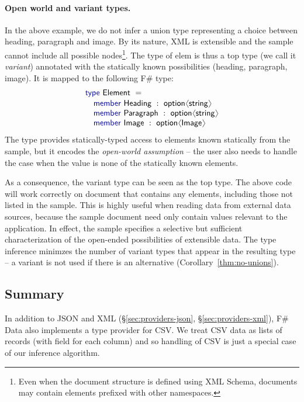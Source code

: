 \documentclass[10pt,preprint,blind,clearpagebib]{sigplanconf}
\newcommand{\langl}{\begin{picture}(4.5,7)
\put(1.1,2.5){\rotatebox{60}{\line(1,0){5.5}}}
\put(1.1,2.5){\rotatebox{300}{\line(1,0){5.5}}}
\end{picture}}
\newcommand{\rangl}{\begin{picture}(4.5,7)
\put(.9,2.5){\rotatebox{120}{\line(1,0){5.5}}}
\put(.9,2.5){\rotatebox{240}{\line(1,0){5.5}}}
\end{picture}}
\newcommand{\kvd}[1]{\textnormal{\textcolor{kvdclr}{\sffamily #1}}}
\newcommand{\ident}[1]{\textnormal{\sffamily #1}}
\begin{document}
\paragraph{Open world and variant types.}
In the above example, we do not infer a union type representing a choice between 
heading, paragraph and image. By its nature, XML is extensible and the sample cannot include all 
possible nodes\footnote{Even when the document structure is defined using XML Schema, documents may 
contain elements prefixed with other namespaces.}. The type of \ident{elem} is thus a top type (we 
call it \emph{variant}) annotated with the statically known possibilities (heading, paragraph, image). 
It is mapped to the following F\# type:
%
\begin{equation*}
\begin{array}{l}
 \kvd{type}~\ident{Element}~=  \\[0.1em]
 \quad \kvd{member}~\ident{Heading}~:~\ident{option}\langl \ident{string} \rangl\\
 \quad \kvd{member}~\ident{Paragraph}~:~\ident{option}\langl \ident{string} \rangl\\
 \quad \kvd{member}~\ident{Image}~:~\ident{option}\langl \ident{Image} \rangl\\
\end{array}
\end{equation*}
%
The type provides statically-typed access to elements known statically from the sample, but it encodes
the \emph{open-world assumption} -- the user also needs to handle the case when the value is none 
of the statically known elements. 

As a consequence, the variant type can be seen as the top type. The above code will work
correctly on document that contains any elements, including those not listed in the sample. This
is highly useful when reading data from external data sources, because the sample document need only
contain values relevant to the application. In effect, the sample specifies a selective
but sufficient characterization of the open-ended possibilities of extensible data. The type 
inference minimzes the number of variant types that appear in the resulting type --
a variant is not used if there is an alternative (Corollary~\ref{thm:no-unions}).


\subsection{Summary}
In addition to JSON and XML (\S\ref{sec:providers-json}, \S\ref{sec:providers-xml}), F\# Data also 
implements a type provider for CSV. We treat CSV data as lists of records (with field for each 
column) and so handling of CSV is just a special case of our inference algorithm.
\end{document}
